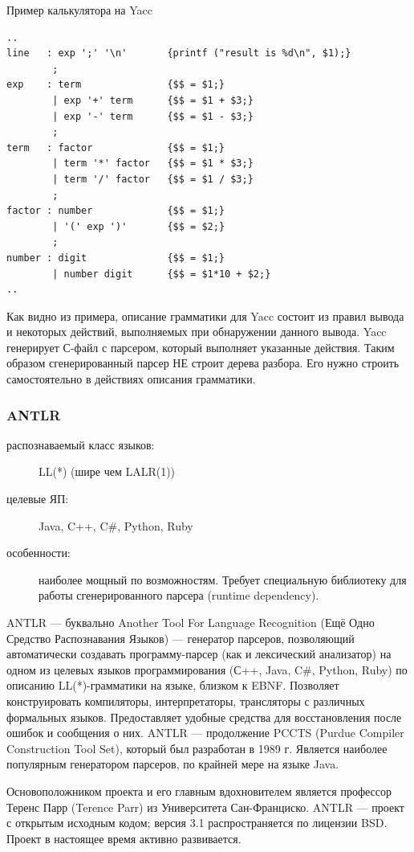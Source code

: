 \documentclass[a4paper,12pt,titlepage]{extarticle}
\begin{document}
Пример калькулятора на Yacc
\begin{verbatim}
..
line   : exp ';' '\n'       {printf ("result is %d\n", $1);}
        ;
exp    : term               {$$ = $1;}
        | exp '+' term      {$$ = $1 + $3;}
        | exp '-' term      {$$ = $1 - $3;}
        ;
term   : factor             {$$ = $1;}
        | term '*' factor   {$$ = $1 * $3;}
        | term '/' factor   {$$ = $1 / $3;}
        ;
factor : number             {$$ = $1;}
        | '(' exp ')'       {$$ = $2;}
        ;
number : digit              {$$ = $1;}
        | number digit      {$$ = $1*10 + $2;}
..
\end{verbatim}

Как видно из примера, описание грамматики для Yacc состоит из правил вывода и
некоторых действий, выполняемых при обнаружении данного вывода.
Yacc генерирует С-файл с парсером, который выполняет указанные действия.
Таким образом сгенерированный парсер НЕ строит дерева разбора. Его нужно строить
самостоятельно в действиях описания грамматики.

\subsubsection*{ANTLR}
\begin{description}
  \item[распознаваемый класс языков:] LL(*) (шире чем LALR(1))
  \item[целевые ЯП:] Java, C++, C\#, Python, Ruby
  \item[особенности:] наиболее мощный по возможностям. Требует специальную
  библиотеку для работы сгенерированного парсера (runtime dependency).
\end{description}
ANTLR — буквально Another Tool For Language Recognition (Ещё Одно Средство
Распознавания Языков) — генератор парсеров, позволяющий автоматически создавать
программу-парсер (как и лексический анализатор) на одном из целевых языков
программирования (С++, Java, C\#, Python, Ruby) по описанию LL(*)-грамматики на
языке, близком к EBNF. Позволяет конструировать компиляторы, интерпретаторы,
трансляторы с различных формальных языков. Предоставляет удобные средства для
восстановления после ошибок и сообщения о них. ANTLR — продолжение PCCTS (Purdue
Compiler Construction Tool Set), который был разработан в 1989 г. Является
наиболее популярным генератором парсеров, по крайней мере на языке Java.

Основоположником проекта и его главным вдохновителем является профессор Теренс
Парр (Terence Parr) из Университета Сан-Франциско. ANTLR — проект с открытым
исходным кодом; версия 3.1 распространяется по лицензии BSD. Проект в
настоящее время активно развивается.
\end{document}
